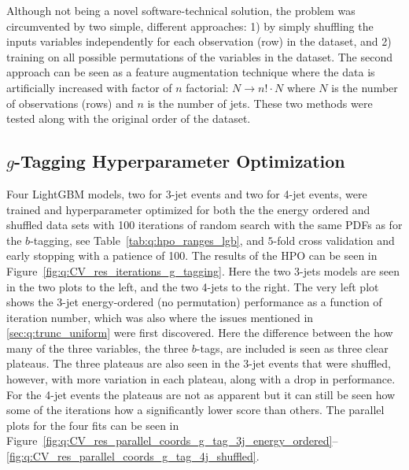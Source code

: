 Although not being a novel software-technical solution, the problem was circumvented by two simple, different approaches: 1) by simply shuffling the inputs variables independently for each observation (row) in the dataset, and 2) training on all possible permutations of the variables in the dataset. The second approach can be seen as a feature augmentation technique where the data is artificially increased with factor of $n$ factorial: $N \rightarrow n!\cdot N$ where $N$ is the number of observations (rows) and $n$ is the number of jets. These two methods were tested along with the original order of the dataset. 

\subsection{$g$-Tagging Hyperparameter Optimization}

Four LightGBM models, two for 3-jet events and two for 4-jet events, were trained and hyperparameter optimized for both the the energy ordered and shuffled data sets with \num{100} iterations of random search with the same PDFs as for the $b$-tagging, see Table~\ref{tab:q:hpo_ranges_lgb}, and $5$-fold cross validation and early stopping with a patience of \num{100}. The results of the HPO can be seen in Figure~\ref{fig:q:CV_res_iterations_g_tagging}. Here the two 3-jets models are seen in the two plots to the left, and the two 4-jets to the right. The very left plot shows the 3-jet energy-ordered (no permutation) performance as a function of iteration number, which was also where the issues mentioned in \autoref{sec:q:trunc_uniform} were first discovered. Here the difference between the how many of the three variables, the three $b$-tags, are included is seen as three clear plateaus. The three plateaus are also seen in the 3-jet events that were shuffled, however, with more variation in each plateau, along with a drop in performance. For the 4-jet events the plateaus are not as apparent but it can still be seen how some of the iterations how a significantly lower score than others. The parallel plots for the four fits can be seen in Figure~\ref{fig:q:CV_res_parallel_coords_g_tag_3j_energy_ordered}--\ref{fig:q:CV_res_parallel_coords_g_tag_4j_shuffled}.

